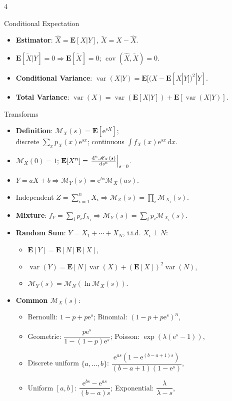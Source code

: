 \documentclass[landscape,a4paper]{article}
\newcommand{\e}{\mathrm{e}}
\newcommand{\EE}{\mathbf{E}}
\newcommand{\var}{\operatorname{var}}
\newcommand{\cov}{\operatorname{cov}}
\begin{document}
\begin{multicols*}{4}
\begin{card}{Conditional Expectation}
\begin{itemize}
\begin{itemize}
				\end{itemize}
				\item \textbf{Estimator}: $\hat X=\EE[X|Y]$, $\tilde X=X-\hat X$.
				\item $\EE[\tilde X|Y]=0\Rightarrow\EE[\tilde X]=0$; $\cov(\hat X,\tilde X)=0$.
				\item \textbf{Conditional Variance}: $\var(X|Y)=\EE[(X-\EE[X|Y])^2|Y]$.
				\item \textbf{Total Variance}: $\var(X)=\var(\EE[X|Y])+\EE[\var(X|Y)]$.
			\end{itemize}
		\end{card}
		\begin{card}{Transforms}
			\begin{itemize}
				\item \textbf{Definition}: $\mathscr{M}_X(s)=\EE[\e^{sX}]$;\\ discrete $\sum_xp_X(x)\e^{sx}$; continuous $\int f_X(x)\e^{sx}\,\mathrm dx$.
				\item $\mathscr{M}_X(0)=1$; $\EE[X^n]=\left.\odv[n]{\mathscr{M}_X(s)}{s}\right|_{s=0}$.
				\item $Y=aX+b\Rightarrow\mathscr{M}_Y(s)=\e^{bs}\mathscr{M}_X(as)$.
				\item Independent $Z=\sum_{i=1}^nX_i\Rightarrow\mathscr{M}_Z(s)=\prod_i\mathscr{M}_{X_i}(s)$.
				\item \textbf{Mixture}: $f_Y=\sum_ip_if_{X_i}\Rightarrow\mathscr{M}_Y(s)=\sum_ip_i\mathscr{M}_{X_i}(s)$.
				\item \textbf{Random Sum}: $Y=X_1+\cdots+X_N$, i.i.d. $X_i\perp N$:
				\begin{itemize}
					\item $\EE[Y]=\EE[N]\EE[X]$,
					\item $\var(Y)=\EE[N]\var(X)+(\EE[X])^2\var(N)$,
					\item $\mathscr{M}_Y(s)=\mathscr{M}_N(\ln\mathscr{M}_X(s))$.
				\end{itemize}
				\item \textbf{Common $\mathscr{M}_X(s)$}:
				\begin{itemize}
					\item Bernoulli: $1-p+p\e^s$; Binomial: $(1-p+p\e^s)^n$,
					\item Geometric: $\dfrac{p\e^s}{1-(1-p)\e^s}$; Poisson: $\exp(\lambda(\e^s-1))$,
					\item Discrete uniform $\{a,\dots,b\}$: $\dfrac{\e^{as}(1-\e^{(b-a+1)s})}{(b-a+1)(1-\e^s)}$,
					\item Uniform $[a,b]$: $\dfrac{\e^{bs}-\e^{as}}{(b-a)s}$; Exponential: $\dfrac{\lambda}{\lambda-s}$,

\end{itemize}
\end{itemize}
\end{card}
\end{multicols*}
\end{document}
